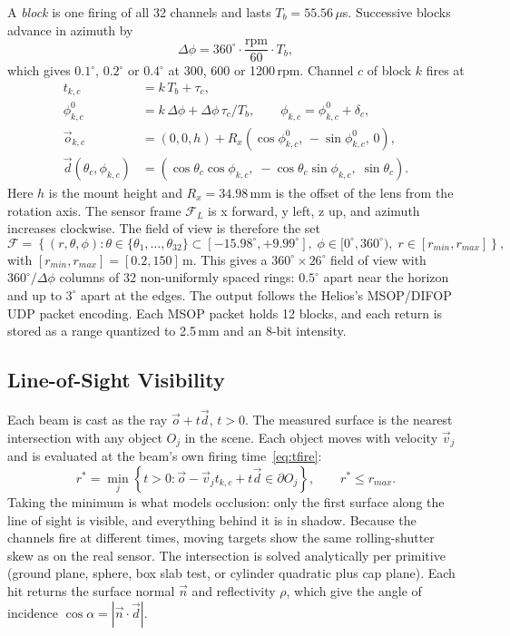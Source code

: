 \documentclass[11pt]{article}
\begin{document}
A \emph{block} is one firing of all 32 channels and lasts $T_b = 55.56\,\mu$s. Successive blocks advance in azimuth by
\begin{equation}\label{eq:dphi}
    \Delta\phi = 360^\circ \cdot \frac{\text{rpm}}{60} \cdot T_b,
\end{equation}
which gives $0.1^\circ$, $0.2^\circ$ or $0.4^\circ$ at 300, 600 or 1200\,rpm. Channel $c$ of block $k$ fires at
\begin{align}
    t_{k,c} &= k\,T_b + \tau_c, \label{eq:tfire}\\
    \phi^0_{k,c} &= k\,\Delta\phi + \Delta\phi\,\tau_c / T_b, \qquad \phi_{k,c} = \phi^0_{k,c} + \delta_c, \\
    \vec{o}_{k,c} &= (0, 0, h) + R_x\left(\cos\phi^0_{k,c},\, -\sin\phi^0_{k,c},\, 0\right), \\
    \vec{d}(\theta_c, \phi_{k,c}) &= \left(\cos\theta_c \cos\phi_{k,c},\; -\cos\theta_c \sin\phi_{k,c},\; \sin\theta_c\right). \label{eq:dir}
\end{align}
Here $h$ is the mount height and $R_x = 34.98$\,mm is the offset of the lens from the rotation axis. The sensor frame $\mathcal{F}_L$
is x forward, y left, z up, and azimuth increases clockwise. The field of view is therefore the set
\begin{equation}
    \mathcal{F} = \left\{ (r, \theta, \phi) : \theta \in \{\theta_1, \dots, \theta_{32}\} \subset [-15.98^\circ, +9.99^\circ],\;
    \phi \in [0^\circ, 360^\circ),\; r \in [r_{min}, r_{max}] \right\},
\end{equation}
with $[r_{min}, r_{max}] = [0.2, 150]$\,m. This gives a $360^\circ \times 26^\circ$ field of view with $360^\circ / \Delta\phi$ columns of 32 non-uniformly spaced rings: $0.5^\circ$ apart
near the horizon and up to $3^\circ$ apart at the edges. The output follows the Helios's MSOP/DIFOP UDP packet encoding.
Each MSOP packet holds 12 blocks, and each return is stored as a range quantized to 2.5\,mm and an 8-bit intensity.

\subsection{Line-of-Sight Visibility}\label{sec:los}
Each beam is cast as the ray $\vec{o} + t\vec{d}$, $t > 0$. The measured surface is the nearest intersection with any object $O_j$
in the scene. Each object moves with velocity $\vec{v}_j$ and is evaluated at the beam's own firing time~\eqref{eq:tfire}:
\begin{equation}\label{eq:los}
    r^* = \min_j \left\{ t > 0 : \vec{o} - \vec{v}_j t_{k,c} + t\vec{d} \in \partial O_j \right\}, \qquad r^* \le r_{max}.
\end{equation}
Taking the minimum is what models occlusion: only the first surface along the line of sight is visible, and everything behind it is in shadow.
Because the channels fire at different times, moving targets show the same rolling-shutter skew as on the real sensor.
The intersection is solved analytically per primitive (ground plane, sphere, box slab test, or cylinder quadratic plus cap plane).
Each hit returns the surface normal $\vec{n}$ and reflectivity $\rho$, which give the angle of incidence $\cos\alpha = |\vec{n} \cdot \vec{d}|$.
\end{document}
